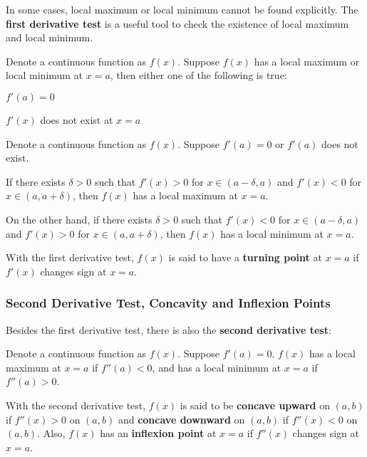 In some cases, local maximum or local minimum cannot be found explicitly. The \textbf{first derivative test} is a useful tool to check the existence of local maximum and local minimum.\n

\begin{thm}
  Denote a continuous function as $f(x)$. Suppose $f(x)$ has a local maximum or local minimum at $x=a$, then either one of the following is true:

  \begin{alist}
    \item $f'(a)=0$
    \item $f'(x)$ does not exist at $x=a$
  \end{alist}
\end{thm}\n

\begin{thm}
  Denote a continuous function as $f(x)$. Suppose $f'(a)=0$ or $f'(a)$ does not exist.\n

   If there exists $\delta>0$ such that $f'(x)>0$ for $x\in(a-\delta,a)$ and $f'(x)<0$ for $x\in(a,a+\delta)$, then $f(x)$ has a local maximum at $x=a$.\n

   On the other hand, if there exists $\delta>0$ such that $f'(x)<0$ for $x\in(a-\delta,a)$ and $f'(x)>0$ for $x\in(a,a+\delta)$, then $f(x)$ has a local minimum at $x=a$.
\end{thm}\n

\begin{dft}
  With the first derivative test, $f(x)$ is said to have a \textbf{turning point} at $x=a$ if $f'(x)$ changes sign at $x=a$.
\end{dft}

\subsubsection{Second Derivative Test, Concavity and Inflexion Points}
Besides the first derivative test, there is also the \textbf{second derivative test}:\n

\begin{thm}
  Denote a continuous function as $f(x)$. Suppose $f'(a)=0$. $f(x)$ has a local maximum at $x=a$ if $f''(a)<0$, and has a local minimum at $x=a$ if $f''(a)>0$.
\end{thm}\n

\begin{dft}
  With the second derivative test, $f(x)$ is said to be \textbf{concave upward} on $(a,b)$ if $f''(x)>0$ on $(a,b)$ and \textbf{concave downward} on $(a,b)$ if $f''(x)<0$ on $(a,b)$. Also, $f(x)$ has an \textbf{inflexion point} at $x=a$ if $f''(x)$ changes sign at $x=a$.
\end{dft}

